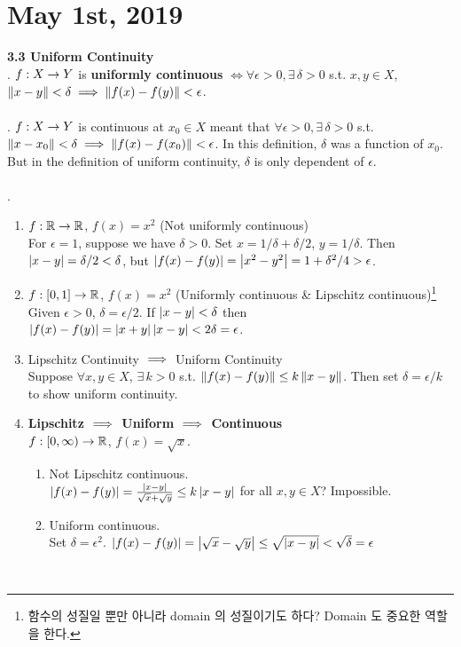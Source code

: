 \section*{May 1st, 2019}
\textbf{3.3 Uniform Continuity}\\
. $f:X\rightarrow Y$ is \textbf{uniformly continuous} $\iff \forall \epsilon>0, \exists\,\delta>0$ s.t. $x, y\in X$, $\left\lVert x - y\right\rVert < \delta \implies \left\lVert f(x) - f(y)\right\rVert < \epsilon$.\\
\\
\rmk. $f:X\rightarrow Y$ is continuous at $x_0\in X$ meant that $\forall \epsilon > 0, \exists\,\delta > 0$ s.t. $\left\lVert x - x_0\right\rVert < \delta \implies \left\lVert f(x) - f(x_0)\right\rVert < \epsilon$. In this definition, $\delta$ was a function of $x_0$. But in the definition of uniform continuity, $\delta$ is only dependent of $\epsilon$.\\
\\
\ex.
\begin{enumerate}
	\item $f:\mathbb{R}\rightarrow\mathbb{R}$, $f(x) = x^2$ (Not uniformly continuous)\\
	For $\epsilon = 1$, suppose we have $\delta > 0$. Set $x = 1/\delta + \delta /2$, $y = 1/\delta$. Then $\left|x - y\right| = \delta / 2 < \delta$, but $\left|f(x) - f(y)\right| = \left|x^2-y^2\right| = 1 + \delta^2/4 > \epsilon$.
	\item $f:[0, 1]\rightarrow \mathbb{R}$, $f(x) = x^2$ (Uniformly continuous \& Lipschitz continuous)\footnote{함수의 성질일 뿐만 아니라 domain 의 성질이기도 하다? Domain 도 중요한 역할을 한다.}\\
	Given $\epsilon > 0$, $\delta = \epsilon / 2$. If $\left|x - y\right| < \delta$ then $\left|f(x) - f(y)\right| = \left|x + y\right| \left|x - y\right| < 2\delta =\epsilon$.
	\item Lipschitz Continuity $\implies$ Uniform Continuity\\
	Suppose $\forall x, y\in X$, $\exists\,k>0$ s.t. $\left\lVert f(x) - f(y)\right\rVert \leq k\left\lVert x -y\right\rVert$. Then set $\delta = \epsilon / k$ to show uniform continuity.
	\item \textbf{Lipschitz $\implies$ Uniform $\implies$ Continuous}\\
	$f:[0, \infty) \rightarrow \mathbb{R}$, $f(x) = \sqrt{x}$.
	\begin{enumerate}
		\item Not Lipschitz continuous.\\
		$\left|f(x) - f(y)\right| = \frac{\left|x-y\right|}{\sqrt{x}+\sqrt{y}} \leq k\left|x - y\right|$ for all $x, y\in X$? Impossible.
		\item Uniform continuous.\\
		Set $\delta = \epsilon^2$. $\left|f(x) - f(y)\right| = \left|\sqrt{x} - \sqrt{y}\right| \leq \sqrt{\left|x - y\right|} < \sqrt{\delta} = \epsilon$
	\end{enumerate}
\end{enumerate}~\\
